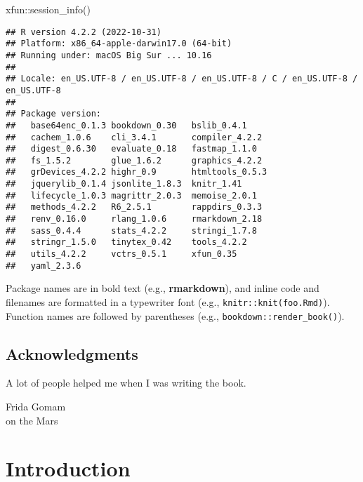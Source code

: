 \documentclass[
]{krantz}
\makeatletter
\newenvironment{Shaded}{\begin{snugshade}}{\end{snugshade}}
\newcommand{\FunctionTok}[1]{\textcolor[rgb]{0,0,0}{#1}}
\newcommand{\NormalTok}[1]{#1}
\newcommand{\SpecialCharTok}[1]{\textcolor[rgb]{0,0,0}{#1}}
\newenvironment{kframe}{%
\medskip{}
\setlength{\fboxsep}{.8em}
 \def\at@end@of@kframe{}%
 \ifinner\ifhmode%
  \def\at@end@of@kframe{\end{minipage}}%
  \begin{minipage}{\columnwidth}%
 \fi\fi%
 \def\FrameCommand##1{\hskip\@totalleftmargin \hskip-\fboxsep
 \colorbox{shadecolor}{##1}\hskip-\fboxsep
     \hskip-\linewidth \hskip-\@totalleftmargin \hskip\columnwidth}%
 \MakeFramed {\advance\hsize-\width
   \@totalleftmargin\z@ \linewidth\hsize
   \@setminipage}}%
 {\par\unskip\endMakeFramed%
 \at@end@of@kframe}
\renewenvironment{Shaded}{\begin{kframe}}{\end{kframe}}
\makeatother
\begin{document}
\begin{Shaded}
\begin{Highlighting}[]
\NormalTok{xfun}\SpecialCharTok{::}\FunctionTok{session\_info}\NormalTok{()}
\end{Highlighting}
\end{Shaded}

\begin{verbatim}
## R version 4.2.2 (2022-10-31)
## Platform: x86_64-apple-darwin17.0 (64-bit)
## Running under: macOS Big Sur ... 10.16
## 
## Locale: en_US.UTF-8 / en_US.UTF-8 / en_US.UTF-8 / C / en_US.UTF-8 / en_US.UTF-8
## 
## Package version:
##   base64enc_0.1.3 bookdown_0.30   bslib_0.4.1    
##   cachem_1.0.6    cli_3.4.1       compiler_4.2.2 
##   digest_0.6.30   evaluate_0.18   fastmap_1.1.0  
##   fs_1.5.2        glue_1.6.2      graphics_4.2.2 
##   grDevices_4.2.2 highr_0.9       htmltools_0.5.3
##   jquerylib_0.1.4 jsonlite_1.8.3  knitr_1.41     
##   lifecycle_1.0.3 magrittr_2.0.3  memoise_2.0.1  
##   methods_4.2.2   R6_2.5.1        rappdirs_0.3.3 
##   renv_0.16.0     rlang_1.0.6     rmarkdown_2.18 
##   sass_0.4.4      stats_4.2.2     stringi_1.7.8  
##   stringr_1.5.0   tinytex_0.42    tools_4.2.2    
##   utils_4.2.2     vctrs_0.5.1     xfun_0.35      
##   yaml_2.3.6
\end{verbatim}

Package names are in bold text (e.g., \textbf{rmarkdown}), and inline code and filenames are formatted in a typewriter font (e.g., \texttt{knitr::knit(\textquotesingle{}foo.Rmd\textquotesingle{})}). Function names are followed by parentheses (e.g., \texttt{bookdown::render\_book()}).

\hypertarget{acknowledgments}{%
\section*{Acknowledgments}\label{acknowledgments}}


A lot of people helped me when I was writing the book.

\begin{flushright}
Frida Gomam\\
on the Mars
\end{flushright}

\mainmatter

\hypertarget{c01}{%
\chapter{Introduction}\label{c01}}
\end{document}
